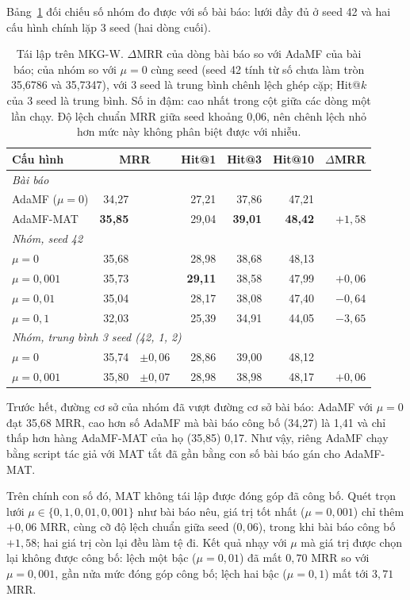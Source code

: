 \documentclass[conference]{IEEEtran}
\renewcommand{\hl}[1]{#1}
\begin{document}
Bảng~\ref{tab:mkgw} đối chiếu số nhóm đo được với số bài báo: lưới đầy đủ ở seed 42 và hai cấu hình
chính lặp 3 seed (hai dòng cuối).

\begin{table}[t]
\caption{Tái lập trên MKG-W. $\Delta$MRR của dòng bài báo so với AdaMF của bài báo; của nhóm so với $\mu=0$ cùng seed
(seed 42 tính từ số chưa làm tròn 35,6786 và 35,7347), với 3 seed là trung bình chênh lệch ghép cặp; Hit@$k$ của 3 seed
là trung bình. Số in đậm: cao nhất trong cột giữa các dòng một lần chạy. Độ lệch chuẩn MRR giữa seed khoảng 0,06, nên
chênh lệch nhỏ hơn mức này không phân biệt được với nhiễu.}
\label{tab:mkgw}
\centering\footnotesize
\setlength{\tabcolsep}{3pt}
\begin{tabular}{lr@{\,}lrrrr}
\toprule
Cấu hình & \multicolumn{2}{c}{MRR} & Hit@1 & Hit@3 & Hit@10 & $\Delta$MRR \\
\midrule
\multicolumn{7}{l}{\emph{Bài báo~\cite{adamfmat}}} \\
AdaMF ($\mu{=}0$) & 34,27 & & 27,21 & 37,86 & 47,21 & \\
AdaMF-MAT & \textbf{35,85} & & 29,04 & \textbf{39,01} & \textbf{48,42} & $+1{,}58$ \\
\midrule
\multicolumn{7}{l}{\emph{Nhóm, seed 42}} \\
$\mu{=}0$ & 35,68 & & 28,98 & 38,68 & 48,13 & \\
$\mu{=}0{,}001$ & 35,73 & & \textbf{29,11} & 38,58 & 47,99 & $+0{,}06$ \\
$\mu{=}0{,}01$ & 35,04 & & 28,17 & 38,08 & 47,40 & $-0{,}64$ \\
$\mu{=}0{,}1$ & 32,03 & & 25,39 & 34,91 & 44,05 & $-3{,}65$ \\
\midrule
\multicolumn{7}{l}{\emph{Nhóm, trung bình 3 seed (42, 1, 2)}} \\
$\mu{=}0$ & 35,74 & ${\pm}0{,}06$ & 28,86 & 39,00 & 48,12 & \\
$\mu{=}0{,}001$ & 35,80 & ${\pm}0{,}07$ & 28,98 & 38,98 & 48,17 & $+0{,}06$ \\
\bottomrule
\end{tabular}
\end{table}

\hl{Trước hết}, đường cơ sở của nhóm đã vượt đường cơ
sở bài báo: AdaMF với $\mu=0$ đạt 35,68 MRR, cao hơn số AdaMF mà bài báo công bố
(34,27) là 1,41 và chỉ thấp hơn hàng AdaMF-MAT của họ (35,85) 0,17.
\hl{Như vậy, riêng AdaMF chạy bằng script tác giả với MAT tắt đã gần bằng con số bài báo gán cho AdaMF-MAT.}

Trên chính con số đó, MAT không tái lập được đóng góp đã công bố. Quét trọn lưới
$\mu \in \{0{,}1, 0{,}01, 0{,}001\}$ như bài báo nêu, giá trị tốt nhất ($\mu=0{,}001$) chỉ thêm
$+0{,}06$ MRR, cùng cỡ độ lệch chuẩn giữa seed ($0{,}06$), trong khi bài báo công bố $+1{,}58$; hai
giá trị còn lại đều làm tệ đi. Kết quả nhạy với $\mu$ mà giá trị được chọn lại không được công bố:
lệch một bậc ($\mu=0{,}01$) đã mất $0{,}70$ MRR so với $\mu=0{,}001$, gần nửa mức đóng góp công bố;
lệch hai bậc ($\mu=0{,}1$) mất tới $3{,}71$ MRR.
\end{document}
